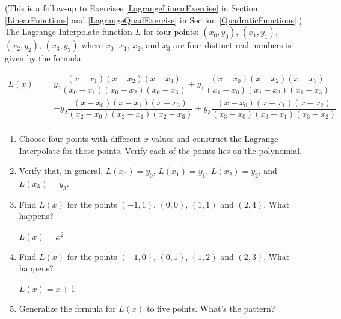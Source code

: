 \documentclass{ximera}
\begin{document}
\begin{problem}\label{LagrangePolyExercise}
(This is a follow-up to Exercises \ref{LagrangeLinearExercise} in Section \ref{LinearFunctions} and \ref{LagrangeQuadExercise} in Section \ref{QuadraticFunctions}.) The  \href{https://en.wikipedia.org/wiki/Lagrange_polynomial}{\underline{Lagrange Interpolate}} function $L$  for four  points:  $(x_{0}, y_{0})$, $(x_{1}, y_{1})$,  $(x_{2}, y_{2})$,   $(x_{3}, y_{3})$ where $x_{0}$,  $x_{1}$, $x_{2}$, and $x_{3}$ are four distinct real numbers is given by the formula: 

 \[ \begin{array}{rcl}
 
 L(x) & = &  y_{0}  \dfrac{(x - x_{1}) (x - x_{2}) (x-x_{3})}{(x_{0} - x_{1})(x_{0} - x_{2})(x_{0} - x_{3})}+ y_{1}  \dfrac{(x - x_{0}) (x - x_{2}) (x-x_{3})}{(x_{1} - x_{0})(x_{1} - x_{2})(x_{1} - x_{3})} \\ [15pt]
         &&  +y_{2}  \dfrac{(x - x_{0}) (x - x_{1}) (x-x_{3})}{(x_{2} - x_{0})(x_{2} - x_{1})(x_{2} - x_{3})}+ y_{3}  \dfrac{(x - x_{0}) (x - x_{1}) (x-x_{2})}{(x_{3} - x_{0})(x_{3} - x_{1})(x_{3} - x_{2})} \\ \end{array}\]

\begin{enumerate}

\item Choose four points with different $x$-values and construct the Lagrange Interpolate for those points.  Verify each of the points lies on the polynomial.  

\item  Verify that, in general, $L(x_{0}) = y_{0}$,  $L(x_{1}) = y_{1}$, $L(x_{2}) = y_{2}$, and  $L(x_{3}) = y_{3}$.

\item  Find $L(x)$ for the points $(-1,1)$, $(0,0)$,  $(1,1)$ and $(2,4)$.  What happens?

\begin{solution}
     $L(x) = x^2$
\end{solution}

\item  Find $L(x)$ for the points $(-1,0)$, $(0,1)$,  $(1,2)$ and $(2,3)$.  What happens?

\begin{solution}
    $L(x) = x+1$
\end{solution}

\item  Generalize the formula for $L(x)$ to five points.  What's the pattern?


\end{enumerate}
    
\end{problem}
 
\end{document}

